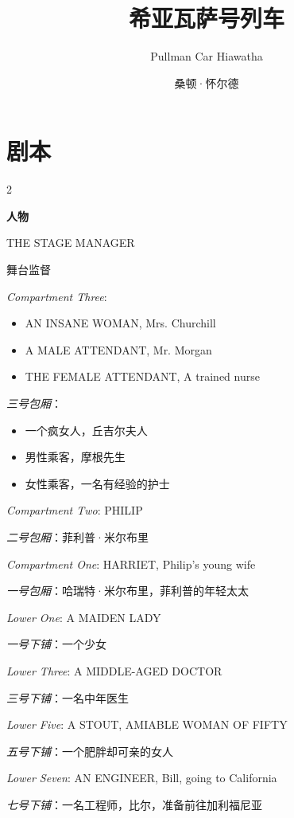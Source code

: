 \documentclass[lang=cn,newtx,10pt,scheme=chinese]{elegantbook}
\title{希亚瓦萨号列车}
\subtitle{Pullman Car Hiawatha}
\author{桑顿·怀尔德}
\institute{抱了又抱戏剧社}
\newcommand{\pair}[2]{%
\switchcolumn* #2\par
\switchcolumn  #1\par
}
\begin{document}
\maketitle
\frontmatter

\tableofcontents

\mainmatter

\part{剧本}


\begin{paracol}{2}


\pair{
    {\huge\textbf{人物}}
}{
    {\huge\textbf{CHARACTERS}}
    \newline
    \newline
}

\pair{舞台监督}{THE STAGE MANAGER}

\pair{
    \textit{三号包厢}：
    \begin{itemize}[leftmargin=5em, labelsep=0.6em, itemsep=0.2em]
        \item 一个疯女人，丘吉尔夫人
        \item 男性乘客，摩根先生
        \item 女性乘客，一名有经验的护士
    \end{itemize}
}{
    \textit{Compartment Three}:
    \begin{itemize}[leftmargin=5em, labelsep=0.6em, itemsep=0.2em]
        \item AN INSANE WOMAN, Mrs. Churchill
        \item A MALE ATTENDANT, Mr. Morgan
        \item THE FEMALE ATTENDANT, A trained nurse
    \end{itemize}
}

\pair{\textit{二号包厢}：菲利普·米尔布里}{\textit{Compartment Two}: PHILIP}

\pair{\textit{一号包厢}：哈瑞特·米尔布里，菲利普的年轻太太}{\textit{Compartment One}: HARRIET, Philip's young wife}

\pair{\textit{一号下铺}：一个少女}{\textit{Lower One}: A MAIDEN LADY}

\pair{\textit{三号下铺}：一名中年医生}{\textit{Lower Three}: A MIDDLE-AGED DOCTOR}

\pair{\textit{五号下铺}：一个肥胖却可亲的女人}{\textit{Lower Five}: A STOUT, AMIABLE WOMAN OF FIFTY}

\pair{\textit{七号下铺}：一名工程师，比尔，准备前往加利福尼亚}{\textit{Lower Seven}: AN ENGINEER, Bill, going to California}


\end{paracol}
\end{document}
